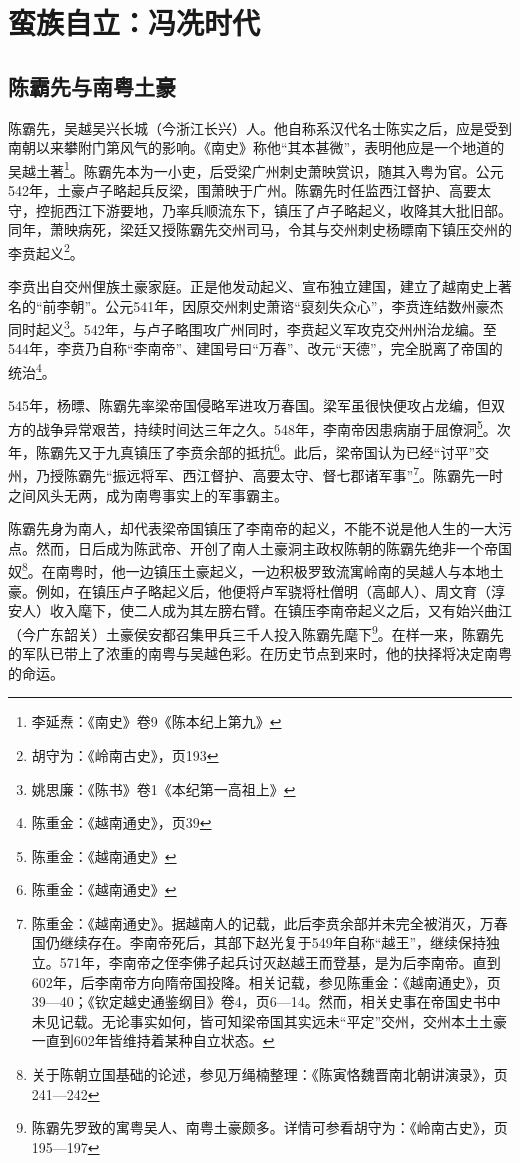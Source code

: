 \chapter{蛮族自立：冯冼时代}

\section{陈霸先与南粤土豪}

陈霸先，吴越吴兴长城（今浙江长兴）人。他自称系汉代名士陈实之后，应是受到南朝以来攀附门第风气的影响。《南史》称他“其本甚微”，表明他应是一个地道的吴越土著\footnote{李延焘：《南史》卷9《陈本纪上第九》}。陈霸先本为一小吏，后受梁广州刺史萧映赏识，随其入粤为官。公元542年，土豪卢子略起兵反梁，围萧映于广州。陈霸先时任监西江督护、高要太守，控扼西江下游要地，乃率兵顺流东下，镇压了卢子略起义，收降其大批旧部。同年，萧映病死，梁廷又授陈霸先交州司马，令其与交州刺史杨瞟南下镇压交州的李贲起义\footnote{胡守为：《岭南古史》，页193}。

李贲出自交州俚族土豪家庭。正是他发动起义、宣布独立建国，建立了越南史上著名的“前李朝”。公元541年，因原交州刺史萧谘“裒刻失众心”，李贲连结数州豪杰同时起义\footnote{姚思廉：《陈书》卷1《本纪第一高祖上》}。542年，与卢子略围攻广州同时，李贲起义军攻克交州州治龙编。至544年，李贲乃自称“李南帝”、建国号曰“万春”、改元“天德”，完全脱离了帝国的统治\footnote{陈重金：《越南通史》，页39}。

545年，杨㬓、陈霸先率梁帝国侵略军进攻万春国。梁军虽很快便攻占龙编，但双方的战争异常艰苦，持续时间达三年之久。548年，李南帝因患病崩于屈僚洞\footnote{陈重金：《越南通史》}。次年，陈霸先又于九真镇压了李贲余部的抵抗\footnote{陈重金：《越南通史》}。此后，梁帝国认为已经“讨平”交州，乃授陈霸先“振远将军、西江督护、高要太守、督七郡诸军事”\footnote{陈重金：《越南通史》。据越南人的记载，此后李贲余部并未完全被消灭，万春国仍继续存在。李南帝死后，其部下赵光复于549年自称“越王”，继续保持独立。571年，李南帝之侄李佛子起兵讨灭赵越王而登基，是为后李南帝。直到602年，后李南帝方向隋帝国投降。相关记载，参见陈重金：《越南通史》，页39—40；《钦定越史通鉴纲目》卷4，页6—14。然而，相关史事在帝国史书中未见记载。无论事实如何，皆可知梁帝国其实远未“平定”交州，交州本土土豪一直到602年皆维持着某种自立状态。}。陈霸先一时之间风头无两，成为南粤事实上的军事霸主。

陈霸先身为南人，却代表梁帝国镇压了李南帝的起义，不能不说是他人生的一大污点。然而，日后成为陈武帝、开创了南人土豪洞主政权陈朝的陈霸先绝非一个帝国奴\footnote{关于陈朝立国基础的论述，参见万绳楠整理：《陈寅恪魏晋南北朝讲演录》，页241—242}。在南粤时，他一边镇压土豪起义，一边积极罗致流寓岭南的吴越人与本地土豪。例如，在镇压卢子略起义后，他便将卢军骁将杜僧明（高邮人）、周文育（淳安人）收入麾下，使二人成为其左膀右臂。在镇压李南帝起义之后，又有始兴曲江（今广东韶关）土豪侯安都召集甲兵三千人投入陈霸先麾下\footnote{陈霸先罗致的寓粤吴人、南粤土豪颇多。详情可参看胡守为：《岭南古史》，页195—197}。在样一来，陈霸先的军队已带上了浓重的南粤与吴越色彩。在历史节点到来时，他的抉择将决定南粤的命运。

